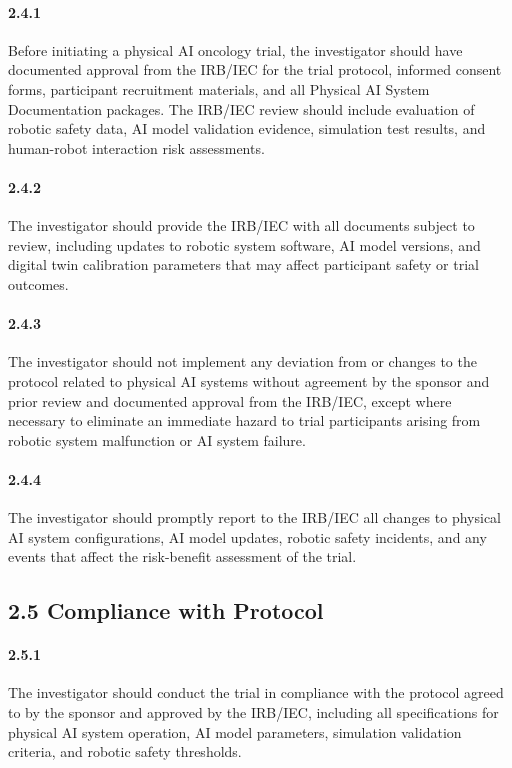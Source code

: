 \documentclass[11pt]{article}
\begin{document}
\paragraph{2.4.1} Before initiating a physical AI oncology trial, the investigator should have documented approval from the IRB/IEC for the trial protocol, informed consent forms, participant recruitment materials, and all Physical AI System Documentation packages. The IRB/IEC review should include evaluation of robotic safety data, AI model validation evidence, simulation test results, and human-robot interaction risk assessments.

\paragraph{2.4.2} The investigator should provide the IRB/IEC with all documents subject to review, including updates to robotic system software, AI model versions, and digital twin calibration parameters that may affect participant safety or trial outcomes.

\paragraph{2.4.3} The investigator should not implement any deviation from or changes to the protocol related to physical AI systems without agreement by the sponsor and prior review and documented approval from the IRB/IEC, except where necessary to eliminate an immediate hazard to trial participants arising from robotic system malfunction or AI system failure.

\paragraph{2.4.4} The investigator should promptly report to the IRB/IEC all changes to physical AI system configurations, AI model updates, robotic safety incidents, and any events that affect the risk-benefit assessment of the trial.

\subsection{2.5 Compliance with Protocol}

\paragraph{2.5.1} The investigator should conduct the trial in compliance with the protocol agreed to by the sponsor and approved by the IRB/IEC, including all specifications for physical AI system operation, AI model parameters, simulation validation criteria, and robotic safety thresholds.
\end{document}
